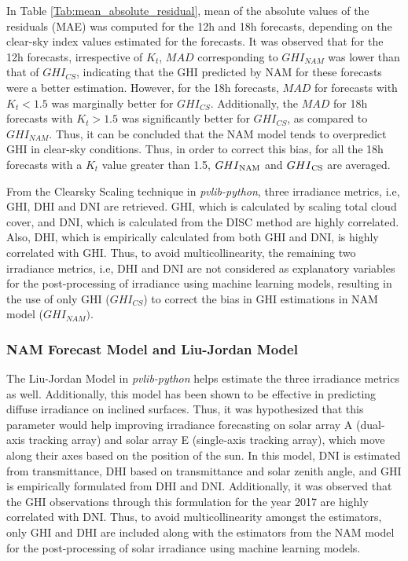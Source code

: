 \par In Table \ref{Tab:mean_absolute_residual}, mean of the absolute values of the residuals (MAE) was computed for the 12h and 18h forecasts, depending on the clear-sky index values estimated for the forecasts. It was observed that for the 12h forecasts, irrespective of $K_t$, $MAD$ corresponding to $GHI_{NAM}$ was lower than that of $GHI_{CS}$, indicating that the GHI predicted by NAM for these forecasts were a better estimation. However, for the 18h forecasts, $MAD$ for forecasts with $K_t < 1.5$ was marginally better for $GHI_{CS}$. Additionally, the $MAD$ for 18h forecasts with $K_t > 1.5$ was significantly better for $GHI_{CS}$, as compared to $GHI_{NAM}$. Thus, it can be concluded that the NAM model tends to overpredict GHI in clear-sky conditions. Thus, in order to correct this bias, for all the 18h forecasts with a $K_t$ value greater than 1.5, $GHI\textsubscript{NAM}$ and $GHI\textsubscript{CS}$ are averaged.

\par From the Clearsky Scaling technique in \textit{pvlib-python}, three irradiance metrics, i.e, GHI, DHI and DNI are retrieved. GHI, which is calculated by scaling total cloud cover, and DNI, which is calculated from the DISC method are highly correlated. Also, DHI, which is empirically calculated from both GHI and DNI, is highly correlated with GHI. Thus, to avoid multicollinearity, the remaining two irradiance metrics, i.e, DHI and DNI are not considered as explanatory variables for the post-processing of irradiance using machine learning models, resulting in the use of only GHI ($GHI_{CS}$) to correct the bias in GHI estimations in NAM model ($GHI_{NAM})$.

\subsubsection*{NAM Forecast Model and Liu-Jordan Model}

The Liu-Jordan Model in \textit{pvlib-python} helps estimate the three irradiance metrics as well. Additionally, this model has been shown to be effective in predicting diffuse irradiance on inclined surfaces. Thus, it was hypothesized that this parameter would help improving irradiance forecasting on solar array A (dual-axis tracking array) and solar array E (single-axis tracking array), which move along their axes based on the position of the sun. In this model, DNI is estimated from transmittance, DHI based on transmittance and solar zenith angle, and GHI is empirically formulated from DHI and DNI. Additionally, it was observed that the GHI observations through this formulation for the year 2017 are highly correlated with DNI. Thus, to avoid multicollinearity amongst the estimators, only GHI and DHI are included along with the estimators from the NAM model for the post-processing of solar irradiance using machine learning models.


